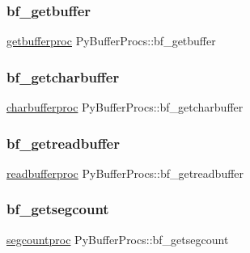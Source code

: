 \subsubsection{\texorpdfstring{bf\_getbuffer}{bf\_getbuffer}}
{\footnotesize\ttfamily \mbox{\hyperlink{__pygame_8h_aa017fb2160e0b5c8aa3da451f0481384}{getbufferproc}} Py\+Buffer\+Procs\+::bf\+\_\+getbuffer}

\mbox{\label{struct_py_buffer_procs_a6e2c77a1fd4c1c065410d6f528b78b1f}} 
\subsubsection{\texorpdfstring{bf\_getcharbuffer}{bf\_getcharbuffer}}
{\footnotesize\ttfamily \mbox{\hyperlink{_python27_2object_8h_a35a0fb030827159d457c4e56551e67c4}{charbufferproc}} Py\+Buffer\+Procs\+::bf\+\_\+getcharbuffer}

\mbox{\label{struct_py_buffer_procs_ac4a4a73a136436206f546a481055d31a}} 
\subsubsection{\texorpdfstring{bf\_getreadbuffer}{bf\_getreadbuffer}}
{\footnotesize\ttfamily \mbox{\hyperlink{_python27_2object_8h_ae0408759caade68a38d4261a98a46f9a}{readbufferproc}} Py\+Buffer\+Procs\+::bf\+\_\+getreadbuffer}

\mbox{\label{struct_py_buffer_procs_a42e75798b3a2192625e3f7630325d1ae}} 
\subsubsection{\texorpdfstring{bf\_getsegcount}{bf\_getsegcount}}
{\footnotesize\ttfamily \mbox{\hyperlink{_python27_2object_8h_ab50a170c6a539bf78aa81942369b4653}{segcountproc}} Py\+Buffer\+Procs\+::bf\+\_\+getsegcount}

\mbox{\label{struct_py_buffer_procs_adf412f37383290afb710d364809e1ffa}} 
